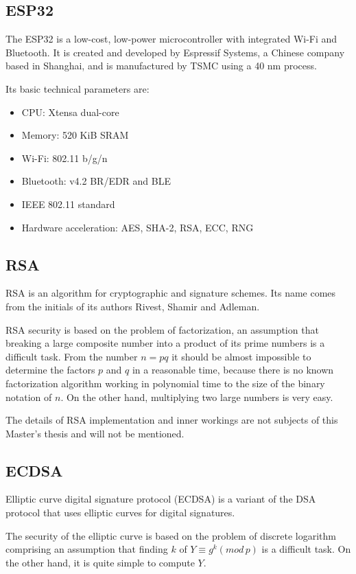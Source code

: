 \documentclass[thesis=M,english]{FITthesis}[2019/12/23]
\begin{document}
\subsection{ESP32}
The ESP32 is a low-cost, low-power microcontroller with integrated Wi-Fi and Bluetooth. It is created and developed by Espressif Systems, a Chinese company based in Shanghai, and is manufactured by TSMC using a 40 nm process.

\bigskip
\noindent
Its basic technical parameters are:
\begin{itemize}
\item	CPU: Xtensa dual-core
\item	Memory: 520 KiB SRAM
\item	Wi-Fi: 802.11 b/g/n
\item	Bluetooth: v4.2 BR/EDR and BLE
\item	IEEE 802.11 standard
\item	Hardware acceleration: AES, SHA-2, RSA, ECC, RNG
\end{itemize}

\subsection{RSA}
RSA is an algorithm for cryptographic and signature schemes. Its name comes from the initials of its authors Rivest, Shamir and Adleman.

\bigskip
\noindent
RSA security is based on the problem of factorization, an assumption that breaking a large composite number into a product of its prime numbers is a difficult task. From the number $n = pq$ it should be almost impossible to determine the factors $p$ and $q$ in a reasonable time, because there is no known factorization algorithm working in polynomial time to the size of the binary notation of $n$. On the other hand, multiplying two large numbers is very easy.

\bigskip
\noindent
The details of RSA implementation and inner workings are not subjects of this Master's thesis and will not be mentioned.

\subsection{ECDSA}
Elliptic curve digital signature protocol (ECDSA) is a variant of the DSA protocol that uses elliptic curves for digital signatures.

\bigskip
\noindent
The security of the elliptic curve is based on the problem of discrete logarithm comprising an assumption that finding $k$ of $Y \equiv g^k (mod \, p)$ is a difficult task. On the other hand, it is quite simple to compute $Y$. 
\end{document}
